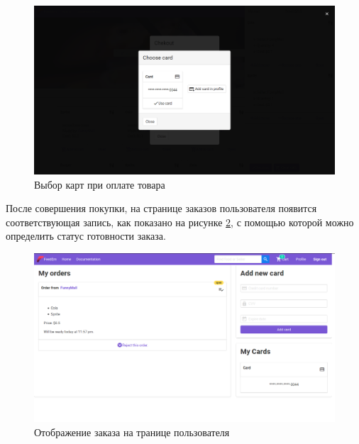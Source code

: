 {  \begin{figure}[H]
    \centering
    \includegraphics[width=\textwidth]{use_card_checkout.png}
    \caption{Выбор карт при оплате товара}
    \label{view_checkout_ok}
  \end{figure}
  После совершения покупки, на странице заказов пользователя появится соответствующая запись, как показано на рисунке \ref{order_in_profile_page}, с помощью которой можно определить статус готовности заказа.

  \begin{figure}[H]
    \centering
    \includegraphics[width=\textwidth]{order_in_profile_page.png}
    \caption{Отображение заказа на транице пользователя}
    \label{order_in_profile_page}
  \end{figure}

}
